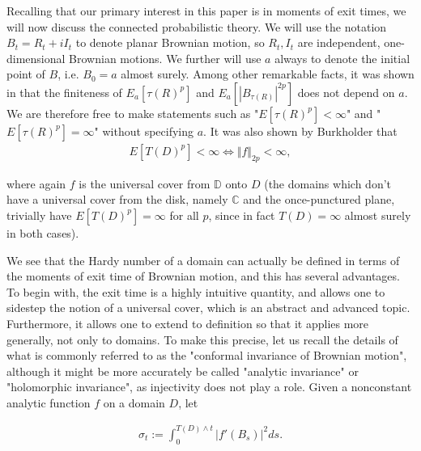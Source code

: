 \documentclass[a4paper, oneside, 12pt]{amsart}
\newcommand{\CC}{\mathbb{C}}
\newcommand{\DD}{\mathbb{D}}
\begin{document}
Recalling that our primary interest in this paper is in moments of exit times, we will now discuss the connected probabilistic theory. We will use the notation $B_t = R_t + i I_t$ to denote planar Brownian motion, so $R_t, I_t$ are independent, one-dimensional Brownian motions. We further will use $a$ always to denote the initial point of $B$, i.e. $B_0 = a$ almost surely. Among other remarkable facts, it was shown in \cite{burk} that the finiteness of
$E_{a}[\tau(R)^{p}]$ and $E_{a}[|B_{\tau(R)}|^{2p}]$ does not
depend on $a$. We are therefore free to make statements such as "$E[\tau(R)^{p}]< \infty$" and "$E[\tau(R)^{p}]=\infty$" without specifying $a$. It was also shown by Burkholder that 
\begin{align*}
    E[T(D)^{p}] < \infty \Longleftrightarrow \Vert f\Vert_{2p} < \infty,
\end{align*}

where again $f$ is the universal cover from $\DD$ onto $D$ (the domains which don't have a universal cover from the disk, namely $\CC$ and the once-punctured plane, trivially have $E[T(D)^{p}] = \infty$ for all $p$, since in fact $T(D) = \infty$ almost surely in both cases).



We see that the Hardy number of a domain can actually be defined in terms of the moments of exit time of Brownian motion, and this has several advantages. To begin with, the exit time is a highly intuitive quantity, and allows one to sidestep the notion of a universal cover, which is an abstract and advanced topic. Furthermore, it allows one to extend to definition so that it applies more generally, not only to domains. To make this precise, let us recall the details of what is commonly referred to as the "conformal invariance of Brownian motion", although it might be more accurately be called "analytic invariance" or "holomorphic invariance", as injectivity does not play a role. Given a nonconstant analytic function $f$ on a domain $D$, let

\begin{align} \label{skyfall}
    \sigma_t :=  \int_0^{T(D) \wedge t} |f'(B_s)|^2 ds. 
\end{align}
\end{document}
